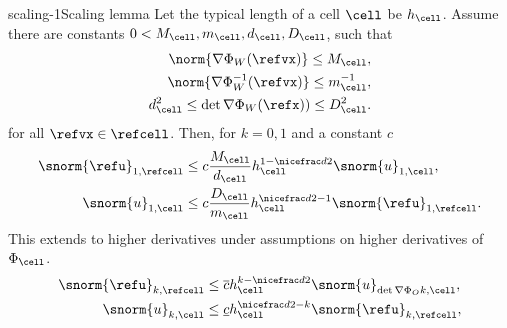 \begin{Lemma*}{scaling-1}{Scaling lemma}
  Let the typical length of a cell $\cell$ be $h_\cell$. Assume there
  are constants $0 < M_\cell, m_\cell, d_\cell, D_\cell$, such that
  \begin{gather}
    \begin{split}
      \norm{\nabla\Phi_W(\refvx)} \le M_\cell,
      \\
      \norm{\nabla\Phi_W^{-1}(\refvx)} \le m_\cell^{-1} ,
      \\
      d^2_\cell \le \det \nabla\Phi_W(\refx)) \le D^2_\cell.      
    \end{split}
  \end{gather}
  for all $\refvx\in\refcell$. Then, for $k=0,1$ and a constant $c$
  \begin{gather}
    \begin{split}
      \snorm{\refu}_{1,\refcell}
      &\le c \frac{M_\cell}{d_\cell}  h_\cell^{1-\nicefrac d2}
      \snorm{u}_{1,\cell},\\
      \snorm{u}_{1,\cell}
      &\le c \frac{D_\cell}{m_\cell} h_\cell^{\nicefrac d2-1}
      \snorm{\refu}_{1,\refcell}.
    \end{split}
  \end{gather}
  This extends to higher derivatives under assumptions on higher
  derivatives of $\Phi_\cell$.
  \begin{gather}
    \begin{split}
      \snorm{\refu}_{k,\refcell}
      &\le \overline c  h_\cell^{k-\nicefrac d2}
      \snorm{u}_{\det\nabla\Phi_Ok,\cell},\\
      \snorm{u}_{k,\cell}
      &\le \underline c h_\cell^{\nicefrac d2-k}
      \snorm{\refu}_{k,\refcell},
    \end{split}
  \end{gather}
\end{Lemma*}

